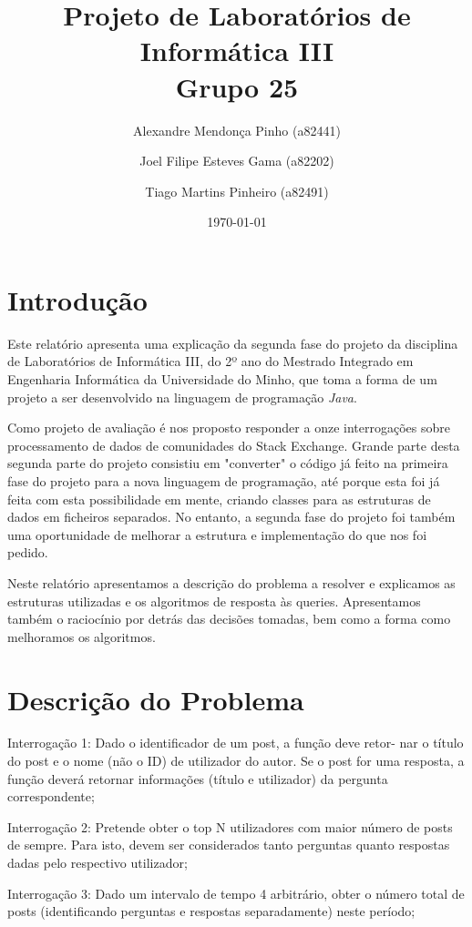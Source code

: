\documentclass[10pt]{report}
\title{Projeto de Laboratórios de Informática III\\Grupo 25	}
\author{Alexandre Mendonça Pinho (a82441) \and Joel Filipe Esteves Gama (a82202) \and Tiago Martins Pinheiro (a82491)}
\date{\today}
\newcommand\tab[1][0.5cm]{\hspace*{#1}}
\begin{document}
\maketitle

\tableofcontents
\chapter{Introdução}
\label{sec:intro}

\tab Este relatório apresenta uma explicação da segunda fase do projeto da disciplina de Laboratórios de Informática III, do 2º ano do Mestrado Integrado em Engenharia Informática da Universidade do Minho, que toma a forma de um projeto a ser desenvolvido na linguagem de programação \textit{Java}.

Como projeto de avaliação é nos proposto responder a onze interrogações sobre processamento de dados de comunidades do Stack Exchange. Grande parte desta segunda parte do projeto consistiu em "converter" o código já feito na primeira fase do projeto para a nova linguagem de programação, até porque esta foi já feita com esta possibilidade em mente, criando classes para as estruturas de dados em ficheiros separados. No entanto, a segunda fase do projeto foi também uma oportunidade de melhorar a estrutura e implementação do que nos foi pedido.

Neste relatório apresentamos a descrição do problema a resolver e explicamos as estruturas utilizadas e os algoritmos de resposta às queries. Apresentamos também o raciocínio por detrás das decisões tomadas, bem como a forma como melhoramos os algoritmos.

\chapter{Descrição do Problema}
\label{sec:problema}

\tab Interrogação 1: Dado o identificador de um post, a função deve retor-
nar o título do post e o nome (não o ID) de utilizador do autor. Se o post
for uma resposta, a função deverá retornar informações (título e utilizador)
da pergunta correspondente;

 Interrogação 2: Pretende obter o top N utilizadores com maior número
de posts de sempre. Para isto, devem ser considerados tanto perguntas
quanto respostas dadas pelo respectivo utilizador;

 Interrogação 3: Dado um intervalo de tempo 4 arbitrário, obter o número
total de posts (identificando perguntas e respostas separadamente) neste
período;
\end{document}
